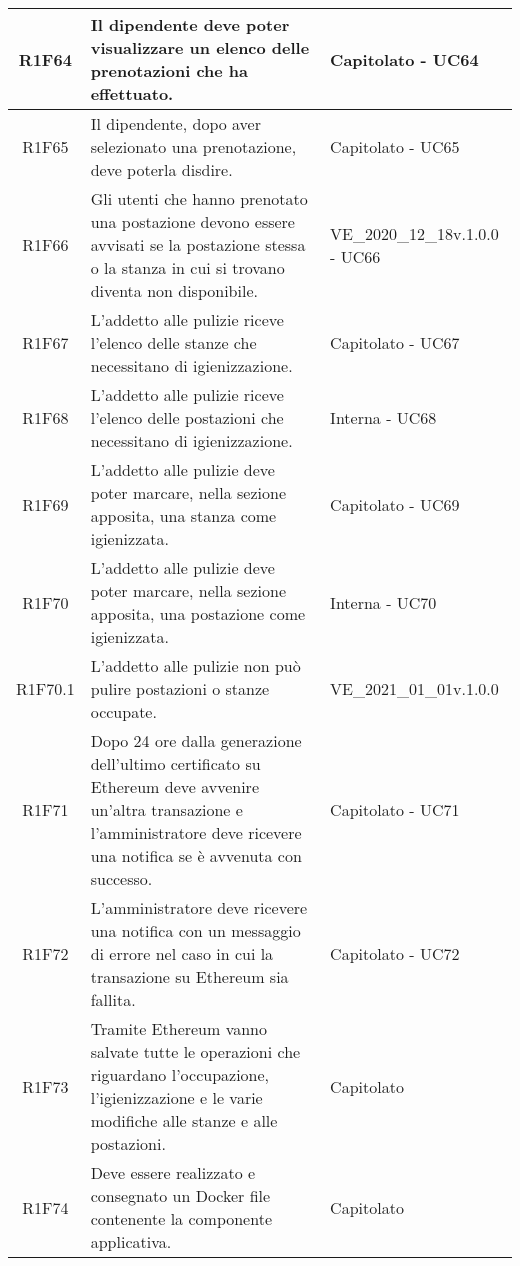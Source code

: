 \begin{center}
\begin{longtable}{|c|p{10cm}|p{4cm}|}
		\hline	
		R1F64&Il dipendente deve poter visualizzare un elenco delle prenotazioni che ha effettuato. & Capitolato - UC64	\\
		\hline
		R1F65&Il dipendente, dopo aver selezionato una prenotazione, deve poterla disdire.	&Capitolato - UC65 	\\
		\hline
		R1F66&Gli utenti che hanno prenotato una postazione devono essere avvisati se la postazione stessa o la stanza in cui si trovano diventa non disponibile.	& VE\_2020\_12\_18v.1.0.0 - UC66	\\
		\hline
		
		R1F67&	L'addetto alle pulizie riceve l'elenco delle stanze che necessitano di igienizzazione.& 	Capitolato - UC67\\
		\hline
		R1F68&L'addetto alle pulizie riceve l'elenco delle postazioni che necessitano di igienizzazione.	& Interna - UC68	\\
		\hline
		R1F69&L'addetto alle pulizie deve poter marcare, nella sezione apposita, una stanza come igienizzata.	& Capitolato - UC69	\\
		\hline
		R1F70&L'addetto alle pulizie deve poter marcare, nella sezione apposita, una postazione come igienizzata.	&Interna - UC70 	\\
		\hline
		R1F70.1&L'addetto alle pulizie non può pulire postazioni o stanze occupate.	& VE\_2021\_01\_01v.1.0.0	\\
		\hline
		R1F71&Dopo 24 ore dalla generazione dell'ultimo certificato su Ethereum deve avvenire un'altra transazione e l'amministratore deve ricevere una notifica se è avvenuta con successo.	& Capitolato - UC71	\\
		\hline
		R1F72&L'amministratore deve ricevere una notifica con un messaggio di errore nel caso in cui la transazione su Ethereum sia fallita.	& Capitolato - UC72	\\
		\hline
		R1F73&Tramite Ethereum vanno salvate tutte le operazioni che riguardano l'occupazione, l'igienizzazione e le varie modifiche alle stanze e alle postazioni.	& Capitolato	\\
		\hline
		R1F74 &Deve essere realizzato e consegnato un Docker file contenente la componente applicativa. & Capitolato\\
		\hline
		
	\end{longtable}
\end{center}



